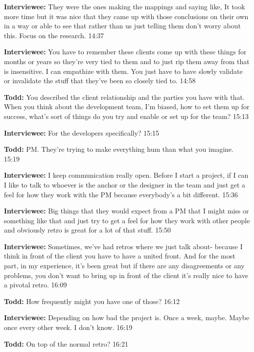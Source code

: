 \textbf{Interviewee:} They were the ones making the mappings and saying like,  It took more time but it was nice that they came up with those conclusions on their own in a way or able to see that rather than us just telling them don't worry about this. Focus on the research. 14:37

\textbf{Interviewee:} You have to remember these clients come up with these things for months or years so they're very tied to them and to just rip them away from that is insensitive. I can empathize with them. You just have to have slowly validate or invalidate the stuff that they've been so closely tied to. 14:58

\textbf{Todd:} You described the client relationship and the parties you have with that. When you think about the development team, I'm biased, how to set them up for success, what's sort of things do you try and enable or set up for the team? 15:13

\textbf{Interviewee:} For the developers specifically? 15:15

\textbf{Todd:} PM. They're trying to make everything hum than what you imagine. 15:19

\textbf{Interviewee:} I keep communication really open. Before I start a project, if I can I like to talk to whoever is the anchor or the designer in the team and just get a feel for how they work with the PM because everybody's a bit different. 15:36

\textbf{Interviewee:} Big things that they would expect from a PM that I might miss or something like that and just try to get a feel for how they work with other people and obviously retro is great for a lot of that stuff. 15:50

\textbf{Interviewee:} Sometimes, we've had retros where we just talk about- because I think in front of the client you have to have a united front. And for the most part, in my experience, it's been great but if there are any disagreements or any problems, you don't want to bring up in front of the client it's really nice to have a pivotal retro. 16:09

\textbf{Todd:} How frequently might you have one of those? 16:12

\textbf{Interviewee:} Depending on how bad the project is. Once a week, maybe. Maybe once every other week. I don't know. 16:19

\textbf{Todd:} On top of the normal retro? 16:21

